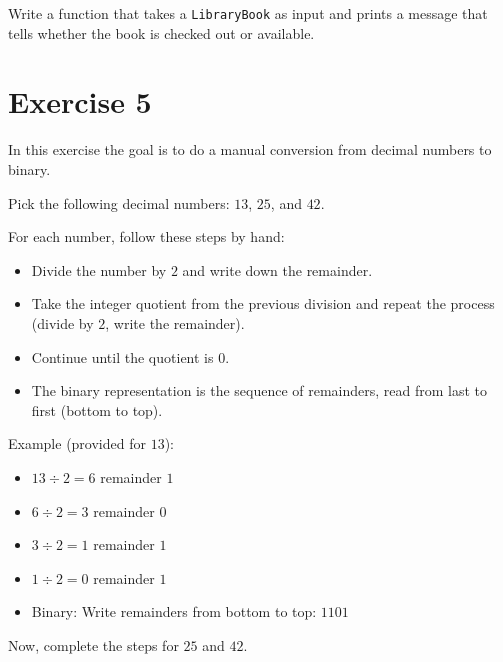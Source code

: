 \documentclass{article}
\begin{document}
\noindent
Write a function that takes a \texttt{LibraryBook} as input and prints a message that tells whether the book is checked out or available.


\section*{Exercise 5}

In this exercise the goal is to do a manual conversion from decimal numbers to binary.

\noindent
Pick the following decimal numbers: $13$, $25$, and $42$.

\noindent
For each number, follow these steps by hand:

\begin{itemize}
    \item Divide the number by $2$ and write down the remainder.

    \item Take the integer quotient from the previous division and repeat the process (divide by $2$, write the remainder).

    \item Continue until the quotient is $0$.

    \item The binary representation is the sequence of remainders, read from last to first (bottom to top).
\end{itemize}

\noindent
Example (provided for $13$):

\begin{itemize}
    \item $13 \div 2 = 6$ remainder $1$

    \item $6 \div 2 = 3$ remainder $0$

    \item $3 \div 2 = 1$ remainder $1$

    \item $1 \div 2 = 0$ remainder $1$
    
    \item Binary: Write remainders from bottom to top: $1101$
\end{itemize}

\noindent
Now, complete the steps for $25$ and $42$.
\end{document}
